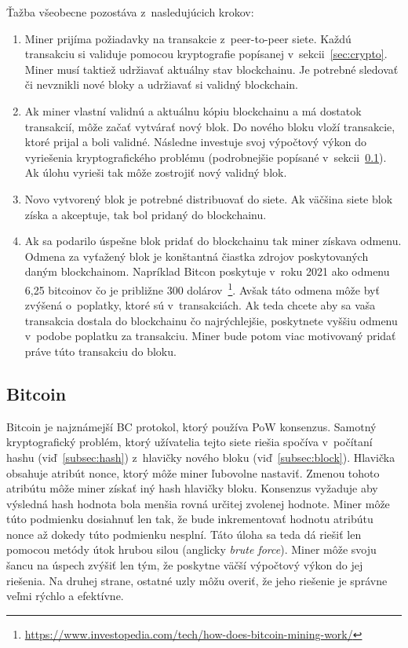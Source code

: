 Ťažba všeobecne pozostáva z~nasledujúcich krokov:
\begin{enumerate}
	\item Miner prijíma požiadavky na transakcie z~peer-to-peer siete. Každú transakciu si validuje pomocou kryptografie popísanej v~sekcii~\ref{sec:crypto}. Miner musí taktiež udržiavať aktuálny stav blockchainu. Je potrebné sledovať či nevznikli nové bloky a udržiavať si validný blockchain.
	\item Ak miner vlastní validnú a aktuálnu kópiu blockchainu a má dostatok transakcií, môže začať vytvárať nový blok. Do nového bloku vloží transakcie, ktoré prijal a boli validné. Následne investuje svoj výpočtový výkon do vyriešenia kryptografického problému (podrobnejšie popísané v~sekcii~\ref{subsec:bitcoin}). Ak úlohu vyrieši tak môže zostrojiť nový validný blok.
	\item Novo vytvorený blok je potrebné distribuovať do siete. Ak väčšina siete blok získa a akceptuje, tak bol pridaný do blockchainu.
	\item Ak sa podarilo úspešne blok pridať do blockchainu tak miner získava odmenu. Odmena za vyťažený blok je konštantná čiastka zdrojov poskytovaných daným blockchainom. Napríklad Bitcon poskytuje v~roku 2021 ako odmenu 6,25 bitcoinov čo je približne 300 dolárov~\footnote{\url{https://www.investopedia.com/tech/how-does-bitcoin-mining-work/}}. Avšak táto odmena môže byť zvýšená o~poplatky, ktoré sú v~transakciách. Ak teda chcete aby sa vaša transakcia dostala do blockchainu čo najrýchlejšie, poskytnete vyššiu odmenu v~podobe poplatku za transakciu. Miner bude potom viac motivovaný pridať práve túto transakciu do bloku.
\end{enumerate}

\subsection{Bitcoin}\label{subsec:bitcoin}
Bitcoin je najznámejší BC protokol, ktorý používa PoW konsenzus. Samotný kryptografický problém, ktorý užívatelia tejto siete riešia spočíva v~počítaní hashu (viď~\ref{subsec:hash}) z~hlavičky nového bloku (viď~\ref{subsec:block}). Hlavička obsahuje atribút nonce, ktorý môže miner ľubovolne nastaviť. Zmenou tohoto atribútu môže miner získať iný hash hlavičky bloku. Konsenzus vyžaduje aby výsledná hash hodnota bola menšia rovná určitej zvolenej hodnote. Miner môže túto podmienku dosiahnuť len tak, že bude inkrementovať hodnotu atribútu nonce až dokedy túto podmienku nesplní. Táto úloha sa teda dá riešiť len pomocou metódy útok hrubou silou (anglicky \textit{brute force}). Miner môže svoju šancu na úspech zvýšiť len tým, že poskytne väčší výpočtový výkon do jej riešenia. Na druhej strane, ostatné uzly môžu overiť, že jeho riešenie je správne veľmi rýchlo a efektívne.~\cite{zhengBlockchainOverview}

